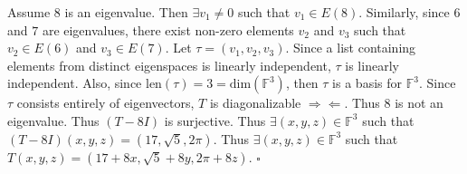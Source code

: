 \documentclass[12pt]{article}
\begin{document}
\noindent Assume $8$ is an eigenvalue.  Then $\exists v_1 \neq 0$ such that $v_1 \in E(8)$.  Similarly, since $6$ and $7$ are eigenvalues, there exist non-zero elements $v_2$ and $v_3$ such that $v_2 \in E(6)$ and $v_3 \in E(7)$.  Let $\tau = (v_1, v_2, v_3)$.  Since a list containing elements from distinct eigenspaces is linearly independent, $\tau$ is linearly independent.  Also, since $\text{len}(\tau) = 3 = \text{dim}(\mathbb{F}^3)$, then $\tau$ is a basis for $\mathbb{F}^3$.  Since $\tau$ consists entirely of eigenvectors, $T$ is diagonalizable $\Longrightarrow\Longleftarrow$.  Thus $8$ is not an eigenvalue.  Thus $(T - 8I)$ is surjective.  Thus $\exists (x, y, z) \in \mathbb{F}^3$ such that $(T - 8I)(x, y, z) = (17, \sqrt{5}, 2\pi)$.  Thus $\exists (x, y, z) \in \mathbb{F}^3$ such that $T(x, y, z) = (17 + 8x, \sqrt{5} + 8y, 2\pi + 8z)$. \hfill $\square$
\end{document}
